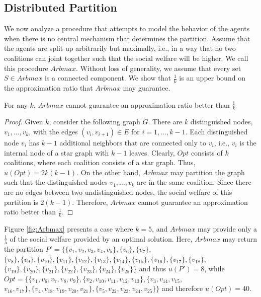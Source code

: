 \documentclass[sigconf,anonymous]{aamas}
\begin{document}
\subsection{Distributed Partition}

We now analyze a procedure that attempts to model the behavior of the agents when there is no central mechanism that determines the partition. Assume that the agents are split up arbitrarily but maximally, i.e., in a way that no two coalitions can joint together such that the social welfare will be higher. We call this procedure $Arbmax$. 
Without loss of generality, we assume that every set $S \in Arbmax$ is a connected component.
We show that $\frac{1}{k}$ is an upper bound on the approximation ratio that $Arbmax$ may guarantee.
\begin{theorem}
For any $k$, $Arbmax$ cannot guarantee an approximation ratio better than $\frac{1}{k}$
\end{theorem}
\begin{proof}
Given $k$, consider the following graph $G$. There are $k$ distinguished nodes, $v_1,\ldots,v_k$, with the edges  $(v_i,v_{i+1})\in E$ for $i=1,\ldots,k-1$. Each distinguished node $v_i$ has $k-1$ additional neighbors that are connected only to $v_i$, i.e., $v_i$ is the internal node of a star graph with $k-1$ leaves. Clearly, $Opt$ consists of $k$ coalitions, where each coalition consists of a star graph. Thus, $u(Opt)=2k(k-1)$. On the other hand, $Arbmax$ may partition the graph such that the distinguished nodes $v_1,\ldots,v_k$ are in the same coalition. Since there are no edges between two undistinguished nodes, the social welfare of this partition is $2(k-1)$. Therefore, $Arbmax$ cannot guarantee an approximation ratio better than $\frac{1}{k}$.
\end{proof}
Figure \ref{fig:Arbmax} presents a case where $k=5$, and $Arbmax$ may provide only a $\frac{1}{5}$ of the social welfare provided by an optimal solution. Here, $Arbmax$ may return the partition 
$P' = \{\{v_1, v_2, v_3, v_4, v_5\}, \{v_6\}, \{v_7\}, $ $ \{v_8\}, \{v_9\}, \{v_{10}\}, \{v_{11}\}, \{v_{12}\}, \{v_{13}\}, \{v_{14}\}, \{v_{15}\}, \{v_{16}\}, \{v_{17}\}, \{v_{18}\},$ \, $ \{v_{19}\}, \{v_{20}\}, \{v_{21}\}, \{v_{22}\}, \{v_{23}\}, \{v_{24}\}, \{v_{25}\}\}$ and thus $u(P') = 8$, while $Opt = \{\{v_1, v_6, v_7, v_8, v_9\}, \{v_2, v_{10}, v_{11}, v_{12}, v_{13}\}, \{v_3, v_{14}, v_{15}, $ \, $ v_{16}, v_{17}\}, \{v_4, v_{18}, v_{19}, v_{20}, v_{21}\}, \{v_5, v_{22}, v_{23}, v_{24}, v_{25}\}\}$ and therefore $u(Opt) = 40$.
\end{document}
